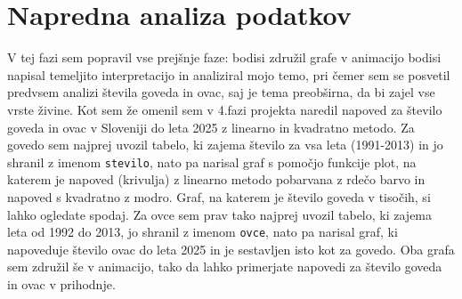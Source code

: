 \documentclass[11pt,a4paper]{article}
\begin{document}
\section{Napredna analiza podatkov}
V tej fazi sem popravil vse prejšnje faze: bodisi združil grafe v animacijo bodisi napisal temeljito interpretacijo in analiziral mojo temo, pri čemer sem se posvetil predvsem analizi števila goveda in ovac, saj je tema preobširna, da bi zajel vse vrste živine. Kot sem že omenil sem v 4.fazi projekta naredil napoved za število goveda in ovac v Sloveniji do leta 2025 z linearno in kvadratno metodo. Za govedo sem najprej uvozil tabelo, ki zajema število za vsa leta (1991-2013) in jo shranil z imenom \verb|stevilo|, nato pa narisal graf s pomočjo funkcije plot, na katerem je napoved (krivulja) z linearno metodo pobarvana z rdečo barvo in napoved s kvadratno z modro. Graf, na katerem je število goveda v tisočih, si lahko ogledate spodaj. Za ovce sem prav tako najprej uvozil tabelo, ki zajema leta od 1992 do 2013, jo shranil z imenom \verb|ovce|, nato pa narisal graf, ki napoveduje število ovac do leta 2025 in je sestavljen isto kot za govedo. Oba grafa sem združil še v animacijo, tako da lahko primerjate napovedi za število goveda in ovac v prihodnje. 

\begin{center}
\\
\end{center}
\end{document}
